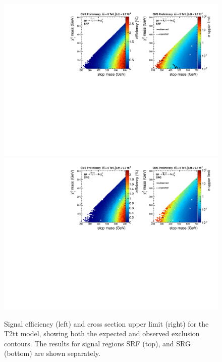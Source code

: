 \begin{figure}[hbt]
  \begin{center}
        \includegraphics[width=1.\linewidth]{plots/T2tt_SRF.pdf}
        \includegraphics[width=1.\linewidth]{plots/T2tt_SRG.pdf}
    \caption{Signal efficiency (left) and cross section upper limit
      (right) for the T2tt model, showing both the expected and
      observed exclusion contours. The results for signal regions SRF (top),
      and SRG (bottom) are shown separately.}
\label{fig:allsrlimits3}
      \end{center}
\end{figure}

